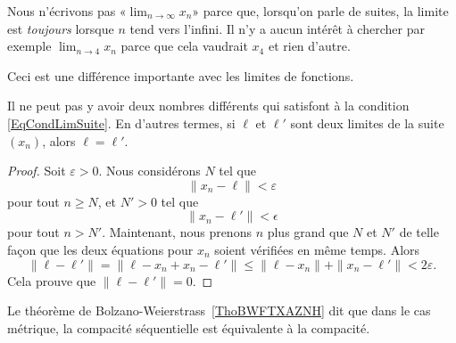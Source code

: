 \begin{remark}
	Nous n'écrivons pas «$\lim_{n\to\infty}x_n$» parce que, lorsqu'on parle de suites, la limite est \emph{toujours} lorsque $n$ tend vers l'infini. Il n'y a aucun intérêt à chercher par exemple $\lim_{n\to 4}x_n$ parce que cela vaudrait $x_4$ et rien d'autre.

	Ceci est une différence importante avec les limites de fonctions.
\end{remark}

\begin{lemma}
	Il ne peut pas y avoir deux nombres différents qui satisfont à la condition \eqref{EqCondLimSuite}. En d'autres termes, si $\ell$ et $\ell'$ sont deux limites de la suite $(x_n)$, alors $\ell=\ell'$.
\end{lemma}

\begin{proof}
	Soit $\varepsilon>0$. Nous considérons $N$ tel que
	\begin{equation}
		\| x_n-\ell \|<\varepsilon
	\end{equation}
	pour tout $n\geq N$, et $N'>0$ tel que
	\begin{equation}
		\| x_n-\ell' \|<\epsilon
	\end{equation}
	pour tout $n>N'$. Maintenant, nous prenons $n$ plus grand que $N$ et $N'$ de telle façon que les deux équations pour $x_n$ soient vérifiées en même temps. Alors
	\begin{equation}
		\| \ell-\ell' \|=\| \ell-x_n+x_n-\ell' \|\leq\| \ell-x_n \|+\| x_n-\ell' \|<2\varepsilon.
	\end{equation}
	Cela prouve que $\| \ell-\ell' \|=0$.
\end{proof}
Le théorème de Bolzano-Weierstrass~\ref{ThoBWFTXAZNH} dit que dans le cas métrique, la compacité séquentielle est équivalente à la compacité.

